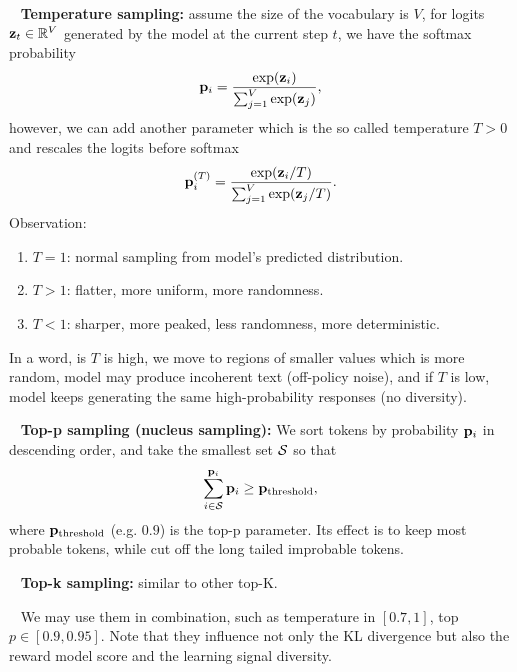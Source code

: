 \documentclass[11pt]{article}  %
\begin{document}
\textbullet~ \textbf{Temperature sampling:} assume the size of the vocabulary is $V$, for logits $\mathbf{z}_t \in \mathbb{R}^{V}$ generated by the model at the current step $t$, we have the softmax probability 
\begin{align*}
  \mathbf{p}_i = \frac{\exp(\mathbf{z}_i)}{\sum_{j=1}^{V}\exp(\mathbf{z}_j)},
\end{align*} 
however, we can add another parameter which is the so called temperature $T > 0$ and rescales the logits before softmax 
\begin{align*}
  \mathbf{p}_i^{(T)} = \frac{\exp(\mathbf{z}_i / T)}{\sum_{j=1}^{V}\exp(\mathbf{z}_j / T)}.
\end{align*}
Observation:
\begin{enumerate}
  \item $T=1$: normal sampling from model's predicted distribution.
  \item $T>1$: flatter, more uniform, more randomness.
  \item $T<1$: sharper, more peaked, less randomness, more deterministic.
\end{enumerate}
In a word, is $T$ is high, we move to regions of smaller values which is more random, model may produce incoherent text (off-policy noise), and if $T$ is low, model keeps generating the same high-probability responses (no diversity).

\textbullet~ \textbf{Top-p sampling (nucleus sampling):} We 
sort tokens by probability $\mathbf{p}_i$ in descending order, and take the smallest set $\mathcal{S}$ so that 
\begin{align*}
  \sum_{i \in \mathcal{S}}^{\mathbf{p}_i} \mathbf{p}_i \geq \mathbf{p}_{\text{threshold}},
\end{align*}
where $\mathbf{p}_{\text{threshold}}$ (e.g. $0.9$) is the top-p parameter. 
Its effect is to keep most probable tokens, while cut off the long tailed improbable tokens.

\textbullet~ \textbf{Top-k sampling:} similar to other top-K.

\textbullet~ We may use them in combination, such as temperature in $[0.7, 1]$, top $p \in [0.9, 0.95]$. 
Note that they influence not only the KL divergence but also the reward model score and the learning signal diversity.
\end{document}
